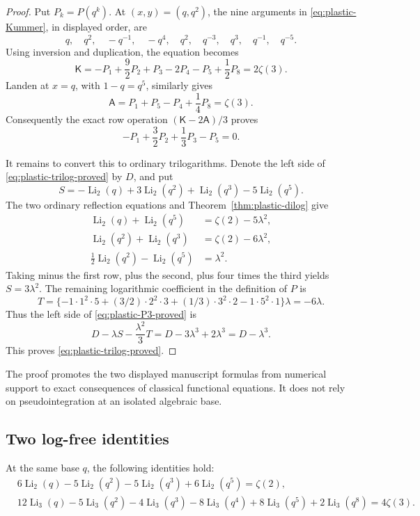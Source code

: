 \begin{proof}
Put $P_k=P(q^k)$.  At $(x,y)=(q,q^2)$, the nine arguments in
\eqref{eq:plastic-Kummer}, in displayed order, are
\[
q,\quad q^2,\quad -q^{-1},\quad -q^4,\quad q^2,
\quad q^{-3},\quad q^3,\quad q^{-1},\quad q^{-5}.
\]
Using inversion and duplication, the equation becomes
\[
\mathsf K=-P_1+\frac92P_2+P_3-2P_4-P_5+\frac12P_8
=2\zeta(3).
\]
Landen at $x=q$, with $1-q=q^5$, similarly gives
\[
\mathsf A=P_1+P_5-P_4+\frac14P_8=\zeta(3).
\]
Consequently the exact row operation $(\mathsf K-2\mathsf A)/3$
proves
\begin{equation}
-P_1+\frac32P_2+\frac13P_3-P_5=0.
\label{eq:plastic-P3-proved}
\end{equation}

It remains to convert this to ordinary trilogarithms.  Denote the
left side of \eqref{eq:plastic-trilog-proved} by $D$, and put
\[
S=-\operatorname{Li}_2(q)+3\operatorname{Li}_2(q^2)
 +\operatorname{Li}_2(q^3)-5\operatorname{Li}_2(q^5).
\]
The two ordinary reflection equations and
Theorem~\ref{thm:plastic-dilog} give
\begin{align*}
\operatorname{Li}_2(q)+\operatorname{Li}_2(q^5)
 &=\zeta(2)-5\lambda^2,\\
\operatorname{Li}_2(q^2)+\operatorname{Li}_2(q^3)
 &=\zeta(2)-6\lambda^2,\\
\tfrac12\operatorname{Li}_2(q^2)-\operatorname{Li}_2(q^5)
 &=\lambda^2.
\end{align*}
Taking minus the first row, plus the second, plus four times the
third yields $S=3\lambda^2$.
The remaining logarithmic coefficient in the definition of $P$ is
\[
T=\{-1\cdot1^2\cdot5
 +(3/2)\cdot2^2\cdot3
 +(1/3)\cdot3^2\cdot2
 -1\cdot5^2\cdot1\}\lambda=-6\lambda.
\]
Thus the left side of \eqref{eq:plastic-P3-proved} is
\[
D-\lambda S-\frac{\lambda^2}{3}T
=D-3\lambda^3+2\lambda^3=D-\lambda^3.
\]
This proves \eqref{eq:plastic-trilog-proved}.
\end{proof}

The proof promotes the two displayed manuscript formulas from
numerical support to exact consequences of classical functional
equations.  It does not rely on pseudointegration at an isolated
algebraic base.

\subsection{Two log-free identities}

\begin{theorem}
\label{thm:plastic-logfree}
At the same base $q$, the following identities hold:
\begin{align}
&6\operatorname{Li}_2(q)-5\operatorname{Li}_2(q^2)
 -5\operatorname{Li}_2(q^3)+6\operatorname{Li}_2(q^5)
 =\zeta(2),\label{eq:plastic-logfree2}\\
&12\operatorname{Li}_3(q)-5\operatorname{Li}_3(q^2)
 -4\operatorname{Li}_3(q^3)-8\operatorname{Li}_3(q^4)
 +8\operatorname{Li}_3(q^5)+2\operatorname{Li}_3(q^8)
 =4\zeta(3).
\label{eq:plastic-logfree3}
\end{align}
\end{theorem}

